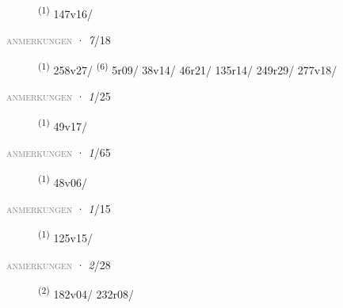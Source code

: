 \begin{description}
    \item[]  \textsuperscript{(1)} \mbox{147v16/}
\end{description}
\textsc{\textcolor{gray}{anmerkungen}}
\ENTRYEND
\noindent{} · \textit{7}/18 \LEMMALINE
\begin{description}
    \item[]  \textsuperscript{(1)} \mbox{258v27/} \CASEBREAK {} \textsuperscript{(6)} \mbox{5r09/} \mbox{38v14/} \mbox{46r21/} \mbox{135r14/} \mbox{249r29/} \mbox{277v18/}
\end{description}
\textsc{\textcolor{gray}{anmerkungen}}
\ENTRYEND
\noindent{} · \textit{1}/25 \LEMMALINE
\begin{description}
    \item[]  \textsuperscript{(1)} \mbox{49v17/}
\end{description}
\textsc{\textcolor{gray}{anmerkungen}}
\ENTRYEND
\noindent{} · \textit{1}/65 \LEMMALINE
\begin{description}
    \item[]  \textsuperscript{(1)} \mbox{48v06/}
\end{description}
\textsc{\textcolor{gray}{anmerkungen}}
\ENTRYEND
\noindent{} · \textit{1}/15 \LEMMALINE
\begin{description}
    \item[]  \textsuperscript{(1)} \mbox{125v15/}
\end{description}
\textsc{\textcolor{gray}{anmerkungen}}
\ENTRYEND
\noindent{} · \textit{2}/28 \LEMMALINE
\begin{description}
    \item[]  \textsuperscript{(2)} \mbox{182v04/} \mbox{232r08/}
\end{description}
